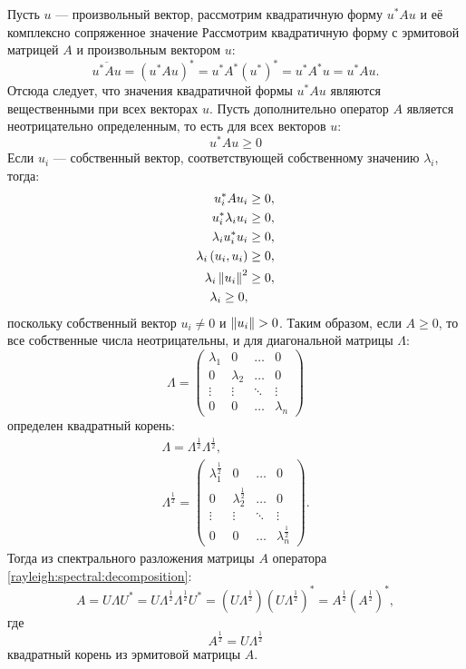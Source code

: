 Пусть $u$ --- произвольный вектор, рассмотрим квадратичную форму $u^* A u$ и её комплексно сопряженное значение
Рассмотрим квадратичную форму с эрмитовой матрицей $A$ и произвольным вектором $u$:
\[
    \overline{u^* A u}
    = \left ( u^* A u \right )^*
    = u^* A^* (u^*)^*
    = u^* A^* u
    = u^* A u .
\]
Отсюда следует, что значения квадратичной формы $u^* A u$ являются вещественными при всех векторах $u$. Пусть дополнительно оператор $A$
является неотрицательно определенным, то есть для всех векторов $u$:
\[
    u^* A u \ge 0
\]
Если $u_i$ --- собственный вектор, соответствующей собственному значению $\lambda_i$, тогда:
\begin{align*}
    u_i^* A u_i & \ge 0 , \\
    u_i^* \lambda_i u_i & \ge 0 , \\
    \lambda_i u_i^* u_i & \ge 0 , \\
    \lambda_i \left ( u_i, u_i \right ) & \ge 0 , \\
    \lambda_i \left \| u_i \right \|^2 & \ge 0 , \\
    \lambda_i \ge 0 ,
\end{align*}
поскольку собственный вектор $u_i \neq 0$ и $\left \| u_i \right \| > 0$. Таким образом, если $A \ge 0$, то все собственные числа неотрицательны, и для диагональной
матрицы $\Lambda$:
\[
    \Lambda
    = \begin{pmatrix}
          \lambda_1 & 0         & \dots  & 0         \\
          0         & \lambda_2 & \dots  & 0         \\
          \vdots    & \vdots    & \ddots & \vdots    \\
          0         & 0         & \dots  & \lambda_n
    \end{pmatrix}
\]
определен квадратный корень:
\begin{gather*}
    \Lambda = \Lambda^{\frac{1}{2}} \Lambda^{\frac{1}{2}} , \\
    \Lambda^\frac{1}{2}
    = \begin{pmatrix}
          \lambda_1^\frac{1}{2} & 0                     & \dots  & 0                     \\
          0                     & \lambda_2^\frac{1}{2} & \dots  & 0                     \\
          \vdots                & \vdots                & \ddots & \vdots                \\
          0                     & 0                     & \dots  & \lambda_n^\frac{1}{2}
    \end{pmatrix}
    .
\end{gather*}
Тогда из спектрального разложения матрицы $A$ оператора \eqref{rayleigh:spectral:decomposition}:
\[
    A
    = U \Lambda U^*
    = U \Lambda^\frac{1}{2} \Lambda^\frac{1}{2} U^*
    = \left ( U \Lambda^\frac{1}{2} \right ) \left ( U \Lambda^\frac{1}{2} \right )^*
    = A^\frac{1}{2} \left ( A^\frac{1}{2} \right )^*,
\]
где
\[
    A^\frac{1}{2} = U \Lambda^\frac{1}{2}
\]
квадратный корень из эрмитовой матрицы $A$.

